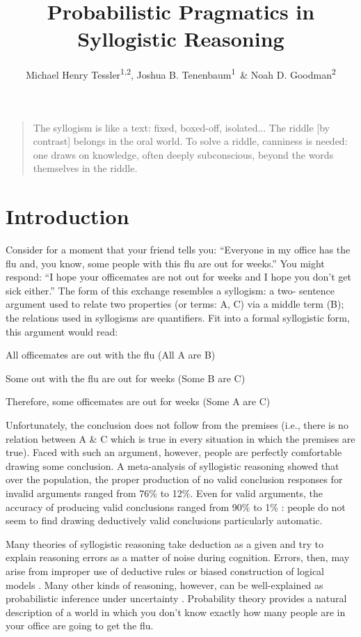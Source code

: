\documentclass[floatsintext, doc]{apa6}
\title{Probabilistic Pragmatics in Syllogistic Reasoning}
\author{Michael Henry Tessler\textsuperscript{1}\textsuperscript{,2}, Joshua B. Tenenbaum\textsuperscript{1}~\& Noah D. Goodman\textsuperscript{2}}
\date{}
\affiliation{
\vspace{0.5cm}
\textsuperscript{1} Department of Brain and Cognitive Sciences, Massachusetts Institute of Technology \\
\textsuperscript{2} Department of Psychology, Stanford University
}
\date{}
\newenvironment{aquote}[1]
{\savebox\mybox{#1}\begin{quote}} {\signed{\usebox\mybox}\end{quote}}
\begin{document}
\maketitle


\begin{aquote}{\textbf{Walter J. Ong}, \emph{Orality and Literacy} (1982)}The syllogism is like a text: fixed, boxed-off, isolated... The riddle [by contrast] belongs in the oral world. To solve a riddle, canniness is needed: one draws on knowledge, often deeply subconscious, beyond the words themselves in the riddle. \end{aquote}


\section{Introduction}


Consider for a moment that your friend tells you: “Everyone in my office has the flu and, you know, some people with this flu are out for weeks.” You might respond: “I hope your officemates are not out for weeks and I hope you don’t get sick either.” The form of this exchange resembles a syllogism: a two- sentence argument used to relate two properties (or terms: A, C) via a middle term (B); the relations used in syllogisms are quantifiers. Fit into a formal syllogistic form, this argument would read:

All officemates are out with the flu (All A are B)

Some out with the flu are out for weeks (Some B are C) 

Therefore, some officemates are out for weeks (Some A are C)

Unfortunately, the conclusion does not follow from the premises (i.e., there is no relation between A \& C which is true in every situation in which the premises are true). Faced with such an argument, however, people are perfectly comfortable drawing some conclusion. A meta-analysis of syllogistic reasoning showed that over the population, the proper production of no valid conclusion responses for invalid arguments ranged from 76\% to 12\%. Even for valid arguments, the accuracy of producing valid conclusions ranged from 90\% to 1\% \cite{Khemlani2012}: people do not seem to find drawing deductively valid conclusions particularly automatic.

Many theories of syllogistic reasoning take deduction as a given and try to explain reasoning errors as a matter of noise during cognition. 
Errors, then, may arise from improper use of deductive rules \cite{rips1994, geurts2003reasoning} or biased construction of logical models \cite{JL1984, Newstead1992}. 
Many other kinds of reasoning, however, can be well-explained as probabilistic inference under uncertainty \cite{tenenbaum2006theory}. 
Probability theory provides a natural description of a world in which you don’t know exactly how many people are in your office are going to get the flu.
\end{document}
